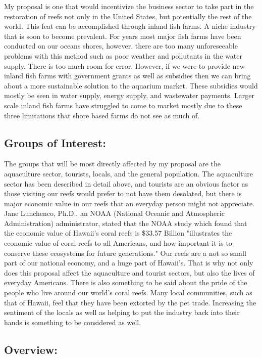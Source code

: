 \documentclass[11pt]{article}
\begin{document}
My proposal is one that would incentivize the business sector to take part in the restoration of reefs not only in the United States, but potentially the rest of the world. This feat can be accomplished through inland fish farms. A niche industry that is soon to become prevalent. For years most major fish farms have been conducted on our oceans shores, however, there are too many unforeseeable problems with this method such as poor weather and pollutants in the water supply. There is too much room for error. However, if we were to provide new inland fish farms with government grants as well as subsidies then we can bring about a more sustainable solution to the aquarium market. These subsidies would mostly be seen in water supply, energy supply, and wastewater payments. Larger scale inland fish farms have struggled to come to market mostly due to these three limitations that shore based farms do not see as much of.

\subsection*{Groups of Interest:}

The groups that will be most directly affected by my proposal are the aquaculture sector, tourists, locals, and the general population. The aquaculture sector has been described in detail above, and tourists are an obvious factor as those visiting our reefs would prefer to not have them desolated, but there is major economic value in our reefs that an everyday person might not appreciate. Jane Lunchenco, Ph.D., an NOAA (National Oceanic and Atmospheric Administration) administrator, stated that the NOAA study which found that the economic value of Hawaii's coral reefs is \$33.57 Billion "illustrates the economic value of coral reefs to all Americans, and how important it is to conserve these ecosystems for future generations." Our reefs are a not so small part of our national economy, and a huge part of Hawaii's. That is why not only does this proposal affect the aquaculture and tourist sectors, but also the lives of everyday Americans. There is also something to be said about the pride of the people who live around our world's coral reefs. Many local communities, such as that of Hawaii, feel that they have been extorted by the pet trade. Increasing the sentiment of the locals as well as helping to put the industry back into their hands is something to be considered as well. 

\subsection*{Overview:} 
\end{document}
